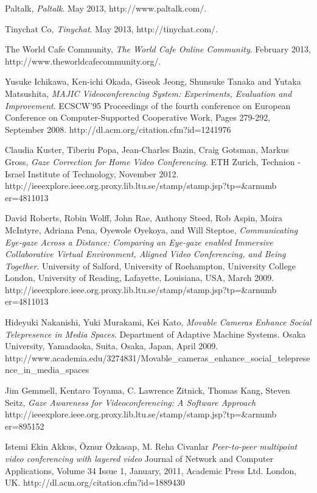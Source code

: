 \documentclass[12pt, titlepage]{article}
\begin{document}
\begin{thebibliography}{9}
  Paltalk,
  \emph{Paltalk}.
  May 2013,
  http://www.paltalk.com/.
  
  Tinychat Co,
  \emph{Tinychat}.
  May 2013,
  http://tinychat.com/.
  
  The World Cafe Community,
  \emph{The World Cafe Online Community}.
  February 2013,
  http://www.theworldcafecommunity.org/.
  
Yusuke Ichikawa, Ken-ichi Okada, Giseok Jeong, Shunsuke Tanaka and Yutaka Matsushita,
\emph{MAJIC Videoconferencing System: Experiments, Evaluation and Improvement}.
ECSCW'95 Proceedings of the fourth conference on European Conference on Computer-Supported Cooperative Work, Pages 279-292, September 2008.
http://dl.acm.org/citation.cfm?id=1241976 


Claudia Kuster, Tiberiu Popa, Jean-Charles Bazin, Craig Gotsman, Markus Gross,
\emph{Gaze Correction for Home Video Conferencing}.
ETH Zurich, Technion - Israel Institute of Technology, November 2012.
http://ieeexplore.ieee.org.proxy.lib.ltu.se/stamp/stamp.jsp?tp=\&arnumb er=4811013

David Roberts, Robin Wolff, John Rae, Anthony Steed, Rob Aspin, Moira McIntyre, Adriana Pena, Oyewole Oyekoya, and Will Steptoe,
\emph{Communicating Eye-gaze Across a Distance: Comparing an Eye-gaze enabled Immersive Collaborative Virtual Environment, Aligned Video Conferencing, and Being Together}.
University of Salford, University of Roehampton, University College London, University of Reading, Lafayette, Louisiana, USA, March 2009.
http://ieeexplore.ieee.org.proxy.lib.ltu.se/stamp/stamp.jsp?tp=\&arnumb er=4811013

Hideyuki Nakanishi, Yuki Murakami, Kei Kato,
\emph{Movable Cameras Enhance Social Telepresence in Media Spaces}.
Department of Adaptive Machine Systems. Osaka University, Yamadaoka, Suita, Osaka, Japan, April 2009.
http://www.academia.edu/3274831/Movable\_cameras\_enhance\_social\linebreak\_telepresence\_in\_media\_spaces

Jim Gemmell, Kentaro Toyama, C. Lawrence Zitnick, Thomas Kang, Steven Seitz,
\emph{Gaze Awareness for Videoconferencing: A Software Approach}
http://ieeexplore.ieee.org.proxy.lib.ltu.se/stamp/stamp.jsp?tp=\&arnumb er=895152

Istemi Ekin Akkus, Öznur Özkasap, M. Reha Civanlar  
\emph{Peer-to-peer multipoint video conferencing with layered video}
Journal of Network and Computer Applications, Volume 34 Issue 1, January, 2011,
Academic Press Ltd. London, UK.
http://dl.acm.org/citation.cfm?id=1889430


\end{thebibliography}
\end{document}
